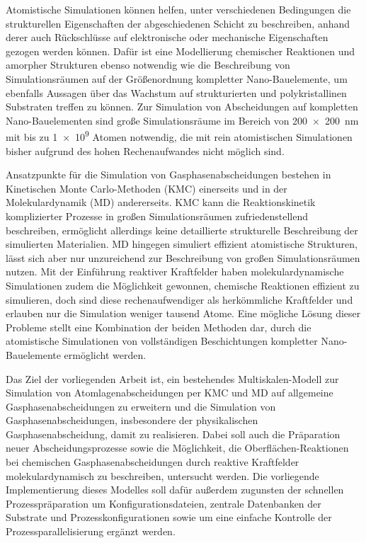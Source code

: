 Atomistische Simulationen können helfen, unter verschiedenen Bedingungen die strukturellen Eigenschaften der abgeschiedenen Schicht zu beschreiben, anhand derer auch Rückschlüsse auf elektronische\cite{aspnes_optical_1982,steudel_influence_2004} oder mechanische Eigenschaften\cite{chasiotis_mechanical_2003,cammarata_nanoindentation_1990} gezogen werden können.
Dafür ist eine Modellierung chemischer Reaktionen und amorpher Strukturen ebenso notwendig wie die Beschreibung von Simulationsräumen auf der Größenordnung kompletter Nano-Bauelemente, um ebenfalls Aussagen über das Wachstum auf strukturierten und polykristallinen Substraten treffen zu können.
Zur Simulation von Abscheidungen auf kompletten Nano-Bauelementen sind große Simulationsräume im Bereich von \SI{200x200}{\nano\meter} mit bis zu \num{1e9} Atomen notwendig, die mit rein atomistischen Simulationen bisher aufgrund des hohen Rechenaufwandes nicht möglich sind\cite{plimpton_computational_1995}.

Ansatzpunkte für die Simulation von Gasphasenabscheidungen bestehen in Kinetischen Monte Carlo-Methoden (KMC)\cite{voter_introduction_2007} einerseits und in der Molekulardynamik (MD)\cite{hoover_molecular_1986} andererseits.
KMC kann die Reaktionskinetik komplizierter Prozesse in großen Simulationsräumen zufriedenstellend beschreiben, ermöglicht allerdings keine detaillierte strukturelle Beschreibung der simulierten Materialien.
MD hingegen simuliert effizient atomistische Strukturen, lässt sich aber nur unzureichend zur Beschreibung von großen Simulationsräumen nutzen.
Mit der Einführung reaktiver Kraftfelder haben molekulardynamische Simulationen zudem die Möglichkeit gewonnen, chemische Reaktionen effizient zu simulieren, doch sind diese rechenaufwendiger als herkömmliche Kraftfelder und erlauben nur die Simulation weniger tausend Atome\cite{van_duin_reaxff:_2001}.
Eine mögliche Lösung dieser Probleme stellt eine Kombination der beiden Methoden dar, durch die atomistische Simulationen von vollständigen Beschichtungen kompletter Nano-Bauelemente ermöglicht werden.


Das Ziel der vorliegenden Arbeit ist, ein bestehendes Multiskalen-Modell zur Simulation von Atomlagenabscheidungen per KMC und MD auf allgemeine Gasphasenabscheidungen zu erweitern und die Simulation von Gasphasenabscheidungen, insbesondere der physikalischen Gasphasenabscheidung, damit zu realisieren.
Dabei soll auch die Präparation neuer Abscheidungsprozesse sowie die Möglichkeit, die Oberflächen-Reaktionen bei chemischen Gasphasenabscheidungen durch reaktive Kraftfelder molekulardynamisch zu beschreiben, untersucht werden.
Die vorliegende Implementierung dieses Modelles soll dafür außerdem zugunsten der schnellen Prozesspräparation um Konfigurationsdateien, zentrale Datenbanken der Substrate und Prozesskonfigurationen sowie um eine einfache Kontrolle der Prozessparallelisierung ergänzt werden.

